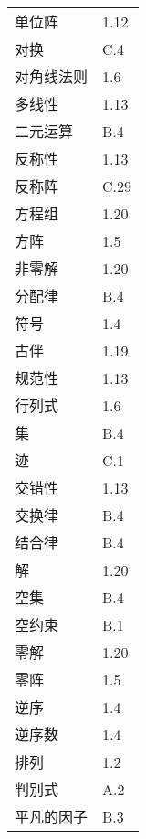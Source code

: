 \begin{longtable}[c]{ll}
    单位阵                      & 1.12 \\
    对换                       & C.4  \\
    对角线法则                    & 1.6  \\
    多线性                      & 1.13 \\

    二元运算                     & B.4  \\

    反称性                      & 1.13 \\
    反称阵                      & C.29 \\
    方程组                      & 1.20 \\
    方阵                       & 1.5  \\
    非零解                      & 1.20 \\
    分配律                      & B.4  \\
    符号                       & 1.4  \\

    古伴                       & 1.19 \\
    规范性                      & 1.13 \\

    行列式                      & 1.6  \\

    集                        & B.4  \\
    迹                        & C.1  \\
    交错性                      & 1.13 \\
    交换律                      & B.4  \\
    结合律                      & B.4  \\
    解                        & 1.20 \\

    空集                       & B.4  \\
    空约束                      & B.1  \\

    零解                       & 1.20 \\
    零阵                       & 1.5  \\

    逆序                       & 1.4  \\
    逆序数                      & 1.4  \\

    排列                       & 1.2  \\
    判别式                      & A.2  \\
    平凡的因子                    & B.3  \\


\end{longtable}
